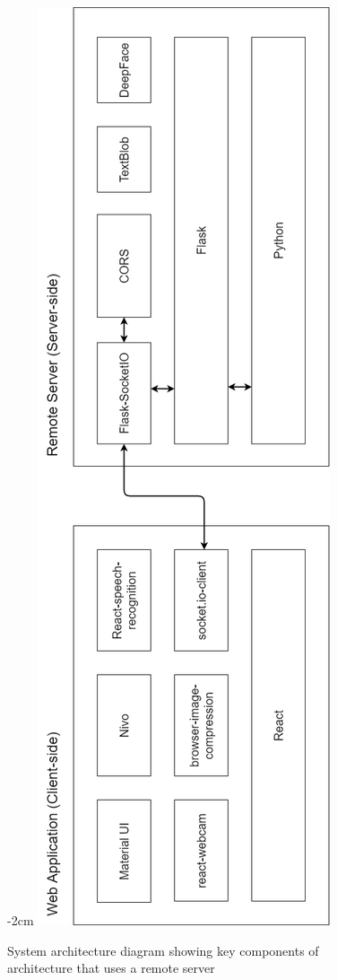\documentclass[12pt, a4paper]{article}
\begin{document}
\begin{appendices}
\begin{figure}[H]
    \centering
    \addtolength{\leftskip} {-2cm}
    \addtolength{\rightskip}{-2cm}
    \includegraphics[scale=0.53]{diagrams/sa1.png}
    \caption{System architecture diagram showing key components of architecture that uses a remote server}
    \label{fig:febe}
\end{figure}


\end{appendices}
\end{document}
